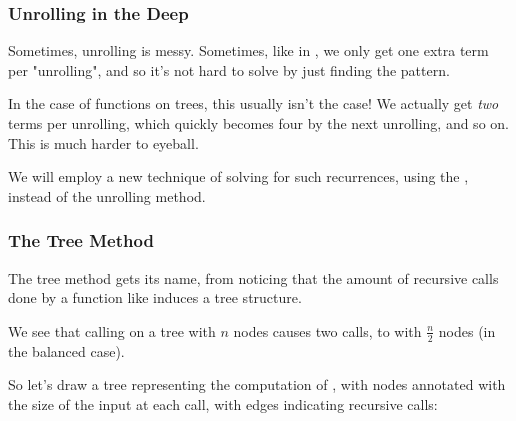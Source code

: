 \documentclass[aspectratio=169, handout]{beamer}
\begin{document}
\begin{frame}[fragile]
  \frametitle{Unrolling in the Deep}

  Sometimes, unrolling is messy. Sometimes, like in , we only get
  one extra term per "unrolling", and so it's not hard to solve by just
  finding the pattern.

  \pause
  \vspace{\fill}

  In the case of functions on trees, this usually isn't the case! We actually
  get \textit{two} terms per unrolling, which quickly becomes four by the
  next unrolling, and so on. This is much harder to eyeball.

  \pause
  \vspace{\fill}

  We will employ a new technique of solving for such recurrences, using the
  , instead of the unrolling method.
\end{frame}

\begin{frame}[fragile]
  \frametitle{The Tree Method}

  \rprs

  The tree method gets its name, from noticing that the amount of recursive
  calls done by a function like  induces a tree structure.

  \pause
  \vspace{\fill}

  We see that calling  on a tree with $n$ nodes causes two
  calls, to  with $\frac{n}{2}$ nodes (in the balanced case).

  \pause
  \vspace{\fill}

  So let's draw a tree representing the computation of , with nodes
  annotated with the size of the input at each call, with edges indicating
  recursive calls:

  \pause
  \vspace{\fill}


\end{frame}
\end{document}
